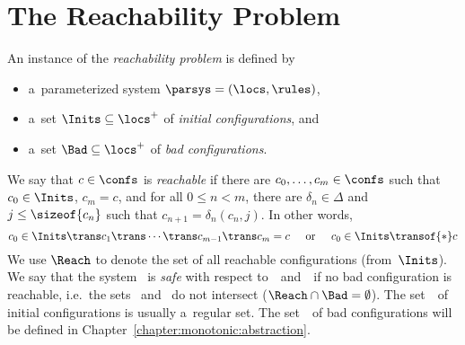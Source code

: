 \section{The Reachability Problem}
\label{section:reachability:problem}
%
%
An instance of the \emph{reachability problem} is defined by
\begin{itemize}
\item a~parameterized system $\parsys = (\locs,\rules)$,
\item {}%
  a~set %
  $\Inits\subseteq\locs^+$ of \emph{initial configurations}, and
\item {}%
  a~set $\Bad\subseteq \locs^+$ of \emph{bad configurations}.
\end{itemize}
%
We say that $c\in\confs$ is \emph{reachable} if %
there are $c_0,\ldots, c_m\in\confs$ such that $c_0\in \Inits$, $c_m =
c$, and for all $0\leq n < m$, there are $\delta_n\in\Delta$ and
$j\leq \sizeof{c_n}$ such that $c_{n+1} = \delta_n(c_{n},j)$.
%
In other words, %
$$c_0\in\Inits\trans c_1\trans\cdots\trans c_{m-1}\trans c_m=c \hspace{5mm}\text{or}\hspace{5mm} c_0\in\Inits\transof{*} c$$
%
We use $\Reach$ to denote the set of all reachable configurations
(from~$\Inits$).
%
%
We say that the system \parsys\ is \emph{safe} with respect to~\Inits\
and~\Bad\ if no bad configuration is reachable, i.e.\ the sets \Reach\
and \Bad\ do not intersect ($\Reach\cap\Bad = \emptyset$).
%
The set~\Inits\ of initial configurations is usually a~regular set.
The set~\Bad\ of bad configurations will be defined in
Chapter~\ref{chapter:monotonic:abstraction}.
